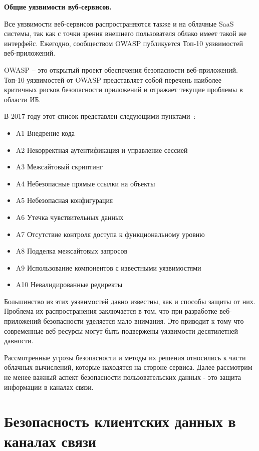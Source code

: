 \textbf{Общие уязвимости вуб-сервисов.}

Все уязвимости веб-сервисов распространяются также и на облачные SaaS системы, так как с точки зрения внешнего пользователя облако имеет такой же интерфейс. Ежегодно, сообществом OWASP публикуется Топ-10 уязвимостей веб-приложений.

OWASP – это открытый проект обеспечения безопасности веб-приложений. Топ-10 уязвимостей от OWASP представляет собой перечень наиболее критичных рисков безопасности приложений и отражает текущие проблемы в области ИБ. 

В 2017 году этот список представлен следующими пунктами~\cite{OWASP}:

\begin{itemize}
	\item A1 Внедрение кода
	\item A2 Некорректная аутентификация и управление сессией
	\item A3 Межсайтовый скриптинг
	\item A4 Небезопасные прямые ссылки на объекты
	\item A5 Небезопасная конфигурация
	\item A6 Утечка чувствительных данных
	\item A7 Отсутствие контроля доступа к функциональному уровню
	\item A8 Подделка межсайтовых запросов
	\item A9 Использование компонентов с известными уязвимостями
	\item A10 Невалидированные редиректы
\end{itemize}

Большинство из этих уязвимостей давно известны, как и способы защиты от них. Проблема их распространения заключается в том, что при разработке веб-приложений безопасности уделяется мало внимания. Это приводит к тому что современные веб ресурсы могут быть подвержены уязвимости десятилетней давности.

Рассмотренные угрозы безопасности и методы их решения относились к части облачных вычислений, которые находятся на стороне сервиса. Далее рассмотрим не менее важный аспект безопасности пользовательских данных - это защита информации в каналах связи.

\section{Безопасность клиентских данных в каналах связи}

